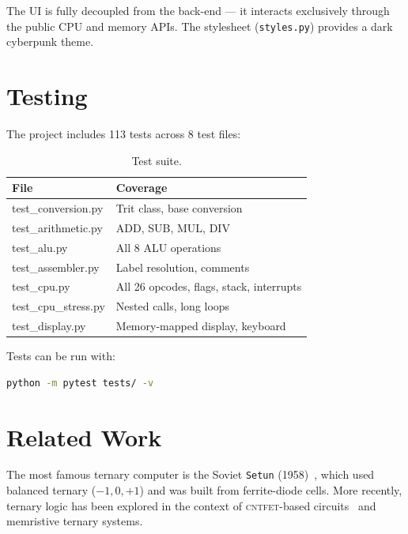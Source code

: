 \documentclass[11pt,a4paper]{article}
\begin{document}
The UI is fully decoupled from the back-end --- it interacts exclusively
through the public CPU and memory APIs.  The stylesheet
(\texttt{styles.py}) provides a dark cyberpunk theme.

\section{Testing}
\label{sec:tests}

The project includes 113 tests across 8 test files:

\begin{table}[H]
  \centering
  \caption{Test suite.}
  \label{tab:tests}
  \begin{tabular}{l|l}
    \textbf{File} & \textbf{Coverage} \\ \hline
    test\_conversion.py  & Trit class, base conversion \\
    test\_arithmetic.py  & ADD, SUB, MUL, DIV \\
    test\_alu.py         & All 8 ALU operations \\
    test\_assembler.py   & Label resolution, comments \\
    test\_cpu.py         & All 26 opcodes, flags, stack, interrupts \\
    test\_cpu\_stress.py & Nested calls, long loops \\
    test\_display.py     & Memory-mapped display, keyboard
  \end{tabular}
\end{table}

Tests can be run with:
\begin{lstlisting}[language=bash]
python -m pytest tests/ -v
\end{lstlisting}

\section{Related Work}
\label{sec:related}

The most famous ternary computer is the Soviet \texttt{Setun}
(1958)~\cite{brusentsov1965setun}, which used balanced ternary
($-1, 0, +1$) and was built from ferrite-diode cells.  More recently,
ternary logic has been explored in the context of
\textsc{cntfet}-based circuits~\cite{lin2022ternary} and
memristive ternary systems.
\end{document}
